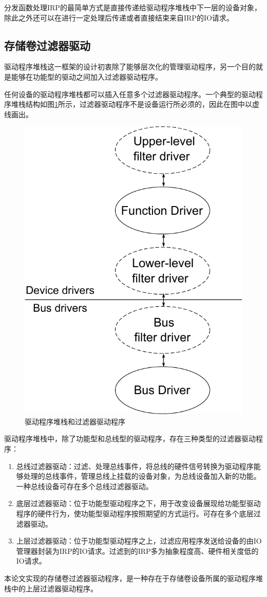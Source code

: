 分发函数处理IRP的最简单方式是直接传递给驱动程序堆栈中下一层的设备对象，除此之外还可以在进行一定处理后传递或者直接结束来自IRP的IO请求。

\subsection{存储卷过滤器驱动}
驱动程序堆栈这一框架的设计初衷除了能够层次化的管理驱动程序，另一个目的就是能够在功能型的驱动之间加入过滤器驱动程序\cite{filterdrv2004}。

任何设备的驱动程序堆栈都可以插入任意多个过滤器驱动程序。一个典型的驱动程序堆栈结构如图\ref{fig:io-stack-filter}所示，过滤器驱动程序不是设备运行所必须的，因此在图中以虚线画出。
\begin{figure}[H]
\centering
\includegraphics[width=0.4\linewidth]{./graph/io-stack-filter}
\caption{驱动程序堆栈和过滤器驱动程序}
\label{fig:io-stack-filter}
\end{figure}

驱动程序堆栈中，除了功能型和总线型的驱动程序，存在三种类型的过滤器驱动程序：

\begin{enumerate}
\item
总线过滤器驱动：过滤、处理总线事件，将总线的硬件信号转换为驱动程序能够处理的总线事件，管理总线上挂载的设备对象，为总线设备加入新的功能。一种总线设备可存在多个总线过滤器驱动。
\item
底层过滤器驱动：位于功能型驱动程序之下，用于改变设备展现给功能型驱动程序的硬件行为，使功能型驱动程序按照期望的方式运行。可存在多个底层过滤器驱动。
\item
上层过滤器驱动：位于功能型驱动程序之上，过滤应用程序发送给设备的由IO管理器封装为IRP的IO请求。过滤到的IRP多为抽象程度高、硬件相关度低的IO请求。
\end{enumerate}

本论文实现的存储卷过滤器驱动程序，是一种存在于存储卷设备所属的驱动程序堆栈中的上层过滤器驱动程序。

